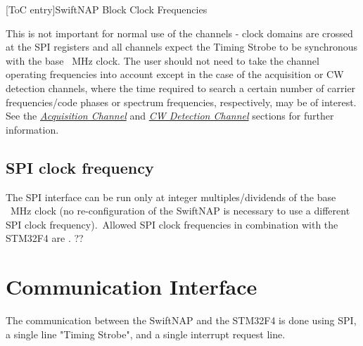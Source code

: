 \documentclass{article}
\begin{document}
\begin{multicols}{2}
\begin{center}
[ToC entry]{SwiftNAP Block Clock Frequencies}
\end{center}
This is not important for normal use of the channels - clock domains are crossed at the SPI registers and all channels expect the Timing Strobe to be synchronous with the base \feclkfreq\ MHz clock. The user should not need to take the channel operating frequencies into account except in the case of the acquisition or CW detection channels, where the time required to search a certain number of carrier frequencies/code phases or spectrum frequencies, respectively, may be of interest. See the \hyperlink{acqlink}{\it{Acquisition Channel}} and \hyperlink{cwlink}{\it{CW Detection Channel}} sections for further information.
\subsection{SPI clock frequency}
The SPI interface can be run only at integer multiples/dividends of the base \feclkfreq\ MHz clock (no re-configuration of the SwiftNAP is necessary to use a different SPI clock frequency).\ Allowed SPI clock frequencies in combination with the STM32F4 are \spiclkfreqs. ??

\section{Communication Interface}
The communication between the SwiftNAP and the STM32F4 is done using SPI, a single line "Timing Strobe", and a single interrupt request line.

\end{multicols}
\end{document}
